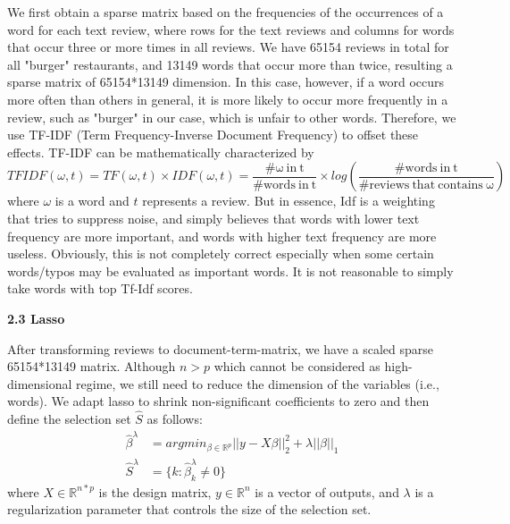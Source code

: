 \documentclass[12pt]{article}
\begin{document}
	We first obtain a sparse matrix based on the frequencies of the occurrences of a word for each text review, where rows for the text reviews and columns for words that occur three or more times in all reviews. We have 65154 reviews in total for all "burger" restaurants, and 13149 words that occur more than twice, resulting a sparse matrix of 65154*13149 dimension. In this case, however, if a word occurs more often than others in general, it is more likely to occur more frequently in a review, such as "burger" in our case, which is unfair to other words. Therefore, we use TF-IDF (Term Frequency-Inverse Document Frequency) to offset these effects. TF-IDF can be mathematically characterized by
	\begin{equation}
	TFIDF(\omega,t) = TF(\omega,t)\times IDF(\omega,t) = \frac{\mathrm{\#\omega~in~t}}{\mathrm{\#words~in~t}}\times log(\frac{\mathrm{\#words~in~t}}{\mathrm{\#reviews~that~contains~\omega}})
	\end{equation}
	where $\omega$ is a word and $t$ represents a review. But in essence, Idf is a weighting that tries to suppress noise, and simply believes that words with lower text frequency are more important, and words with higher text frequency are more useless. Obviously, this is not completely correct especially when some certain words/typos may be evaluated as important words. It is not reasonable to simply take words with top Tf-Idf scores.
	
	\noindent\textbf{2.3 Lasso}
	
	After transforming reviews to document-term-matrix, we have a scaled sparse 65154*13149 matrix. Although $n>p$ which cannot be considered as high-dimensional regime, we still need to reduce the dimension of the variables (i.e., words). We adapt lasso to shrink non-significant coefficients to zero and then define the selection set $\hat{S}$ as follows:
	\begin{equation}
	\begin{aligned}
	\hat{\beta}^\lambda &= argmin_{\beta \in \mathbb{R}^p} ||y-X\beta||_2^2+\lambda||\beta||_1\\
	\hat{S}^\lambda &= \{k:\hat{\beta}_k^\lambda \neq 0\}
	\end{aligned}
	\end{equation}
	where $X \in\mathbb{R} ^{n*p} $ is the design matrix, $y \in \mathbb{R}^n$ is a vector of outputs, and $\lambda$ is a regularization parameter that controls the size of the selection set.
	
\end{document}

